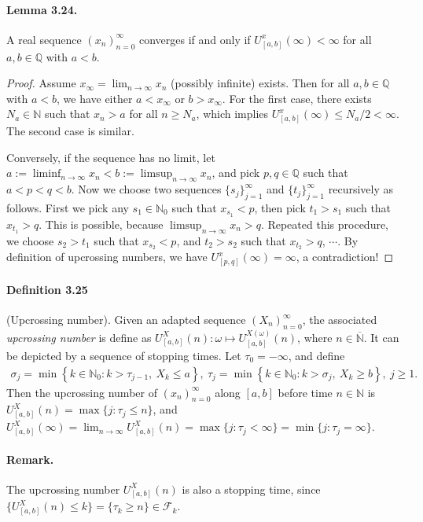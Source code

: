 \documentclass{article}
\numberwithin{equation}{section}
\theoremstyle{plain}
\theoremstyle{definition}
\begin{document}
\paragraph{Lemma 3.24.\label{lemma:3.24}} A real sequence $(x_n)_{n=0}^\infty$ converges if and only if $U_{[a,b]}^x(\infty)<\infty$ for all $a,b\in\mathbb{Q}$ with $a<b$.
\begin{proof}
Assume $x_\infty=\lim_{n\to\infty} x_n$ (possibly infinite) exists. Then for all $a,b\in\mathbb{Q}$ with $a<b$, we have either $a<x_\infty$ or $b>x_\infty$. For the first case, there exists $N_a\in\mathbb{N}$ such that $x_n>a$ for all $n\geq N_a$, which implies $U_{[a,b]}^x(\infty)\leq N_a/2<\infty$. The second case is similar.

Conversely, if the sequence has no limit, let $a:=\liminf_{n\to\infty}x_n<b:=\limsup_{n\to\infty}x_n$, and pick $p,q\in\mathbb{Q}$ such that $a<p<q<b$. Now we choose two sequences $\{s_j\}_{j=1}^\infty$ and $\{t_j\}_{j=1}^\infty$ recursively as follows. First we pick any $s_1\in\mathbb{N}_0$ such that $x_{s_1}<p$, then pick $t_1>s_1$ such that $x_{t_1}>q$. This is possible, because $\limsup_{n\to\infty} x_n>q$. Repeated this procedure, we choose $s_2>t_1$ such that $x_{s_2}<p$, and $t_2>s_2$ such that $x_{t_2}>q$, $\cdots$. By definition of upcrossing numbers, we have $U_{[p,q]}^x(\infty)=\infty$, a contradiction!
\end{proof}

\paragraph{Definition 3.25\label{def:3.25}} (Upcrossing number). Given an adapted sequence $(X_n)_{n=0}^\infty$, the associated \textit{upcrossing number} is define as $U_{[a,b]}^X(n):\omega\mapsto U_{[a,b]}^{X(\omega)}(n)$, where $n\in\overline{\mathbb{N}}$. It can be depicted by a sequence of stopping times. Let $\tau_0=-\infty$, and define
\begin{align*}
	\sigma_j=\min\left\{k\in\mathbb{N}_0:k>\tau_{j-1},\ X_k\leq a\right\},\ \tau_j=\min\left\{k\in\mathbb{N}_0:k>\sigma_j,\ X_k\geq b\right\},\ j\geq 1.
\end{align*}
Then the upcrossing number of $(x_n)_{n=0}^\infty$ along $[a,b]$ before time $n\in\mathbb{N}$ is $U_{[a,b]}^X(n)=\max\{j:\tau_j\leq n\}$, and $U_{[a,b]}^X(\infty)=\lim_{n\to\infty}U_{[a,b]}^X(n)=\max\{j:\tau_j<\infty\}=\min\{j:\tau_j=\infty\}$.

\paragraph{Remark.} The upcrossing number $U_{[a,b]}^X(n)$ is also a stopping time, since $\{U_{[a,b]}^X(n)\leq k\}=\{\tau_k\geq n\}\in\mathscr{F}_k$.
\end{document}
